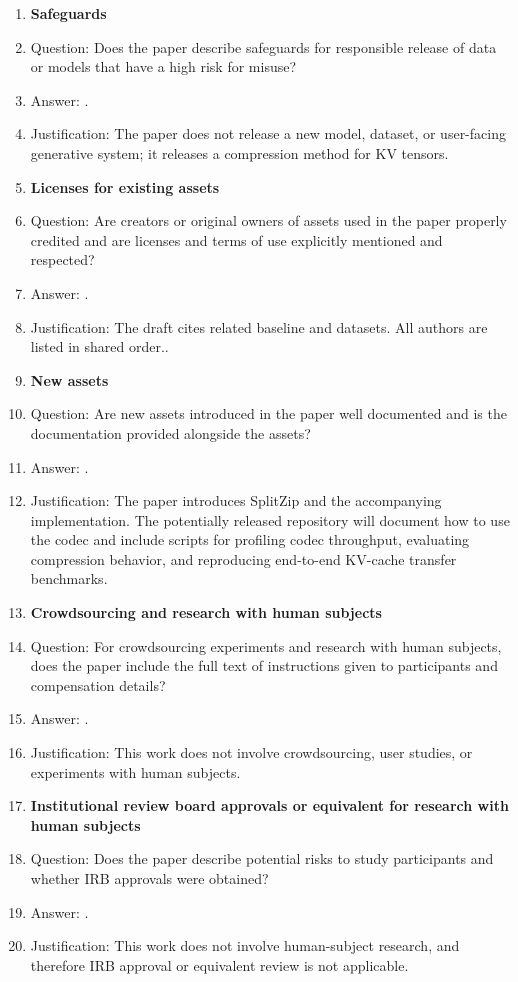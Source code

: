 \begin{enumerate}
\item {\bf Safeguards}
    \item[] Question: Does the paper describe safeguards for responsible release of data or models that have a high risk for misuse?
    \item[] Answer: \answerNA{}.
    \item[] Justification: The paper does not release a new model, dataset, or user-facing generative system; it releases a compression method for KV tensors.

\item {\bf Licenses for existing assets}
    \item[] Question: Are creators or original owners of assets used in the paper properly credited and are licenses and terms of use explicitly mentioned and respected?
    \item[] Answer: \answerYes{}.
    \item[] Justification: The draft cites related baseline and datasets. All authors are listed in shared order..

\item {\bf New assets}
    \item[] Question: Are new assets introduced in the paper well documented and is the documentation provided alongside the assets?
    \item[] Answer: \answerYes{}.
    \item[] Justification: The paper introduces SplitZip and the accompanying implementation. The potentially released repository will document how to use the codec and include scripts for profiling codec throughput, evaluating compression behavior, and reproducing end-to-end KV-cache transfer benchmarks.

\item {\bf Crowdsourcing and research with human subjects}
    \item[] Question: For crowdsourcing experiments and research with human subjects, does the paper include the full text of instructions given to participants and compensation details?
    \item[] Answer: \answerNA{}.
    \item[] Justification: This work does not involve crowdsourcing, user studies, or experiments with human subjects.

\item {\bf Institutional review board approvals or equivalent for research with human subjects}
    \item[] Question: Does the paper describe potential risks to study participants and whether IRB approvals were obtained?
    \item[] Answer: \answerNA{}.
    \item[] Justification: This work does not involve human-subject research, and therefore IRB approval or equivalent review is not applicable.


\end{enumerate}
